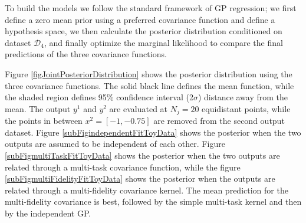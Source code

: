 \begin{mdframed}[hidealllines=true,backgroundcolor=lightgray!20]
To build the models we follow the standard framework of GP regression; we first define a zero mean prior using a preferred covariance function and define a hypothesis space, we then calculate the posterior distribution conditioned on dataset $\mathcal{D}_{4}$, and finally optimize the marginal likelihood to compare the final predictions of the three covariance functions. 

Figure \ref{figJointPosteriorDistribution} shows the posterior distribution using the three covariance functions. The solid black line defines the mean function, while the shaded region defines 95\% confidence interval (2$\sigma$) distance away from the mean. The output $y^{1}$ and $y^2$ are evaluated at $N_{j}=20$ equidistant points, while the points in between $x^2 = [-1, -0.75]$ are removed from the second output dataset. Figure \ref{subFigindependentFitToyData} shows the posterior when the two outputs are assumed to be independent of each other. Figure \ref{subFigmultiTaskFitToyData} shows the posterior when the two outputs are related through a multi-task covariance function, while the figure \ref{subFigmultiFidelityFitToyData} shows the posterior when the outputs are related through a multi-fidelity covariance kernel. The mean prediction for the multi-fidelity covariance is best, followed by the simple multi-task kernel and then by the independent GP.
\end{mdframed}

